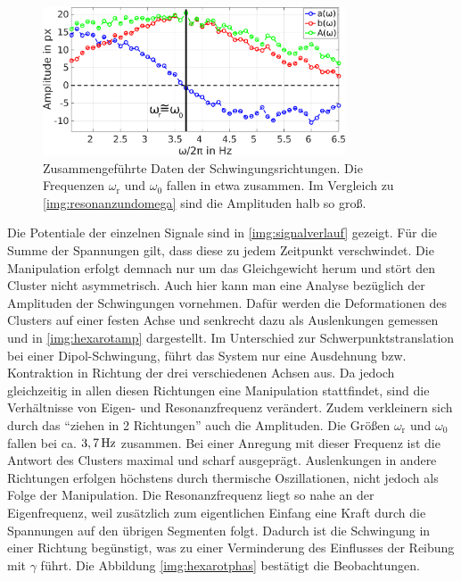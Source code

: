 \documentclass[numbers=noenddot,a4paper,notitlepage,twoside,BCOR15mm]{scrbook}
\newcommand{\ix}[1]{_\text{#1}}
\begin{document}
						\begin{figure}[!b]
							\centering
							\includegraphics[width=0.8\textwidth,height=0.37\textwidth]{figs/auswertung/phasen/rotphasenaufg.png}
							\caption{Zusammengeführte Daten der Schwingungsrichtungen. Die Frequenzen $\omega\ix{r}$ und $\omega\ix{0}$ fallen in etwa zusammen. Im Vergleich zu \autoref{img:resonanzundomega} sind die Amplituden halb so groß.}\label{img:hexarotphas}
						\end{figure}

						Die Potentiale der einzelnen Signale sind in \autoref{img:signalverlauf} gezeigt. Für die Summe der Spannungen gilt, dass diese zu jedem Zeitpunkt verschwindet. Die Manipulation erfolgt demnach nur um das Gleichgewicht herum und stört den Cluster nicht asymmetrisch. Auch hier kann man eine Analyse bezüglich der Amplituden der Schwingungen vornehmen. Dafür werden die Deformationen des Clusters auf einer festen Achse und senkrecht dazu als Auslenkungen gemessen und in \autoref{img:hexarotamp} dargestellt. Im Unterschied zur Schwerpunktstranslation bei einer Dipol-Schwingung, führt das System nur eine Ausdehnung bzw. Kontraktion in Richtung der drei verschiedenen Achsen aus. Da jedoch gleichzeitig in allen diesen Richtungen eine Manipulation stattfindet, sind die Verhältnisse von Eigen- und Resonanzfrequenz verändert. Zudem verkleinern sich durch das "`ziehen in 2 Richtungen"' auch die Amplituden. Die Größen $\omega\ix{r}$ und $\omega\ix{0}$ fallen bei ca. $\unit[3,7]{Hz}$ zusammen. Bei einer Anregung mit dieser Frequenz ist die Antwort des Clusters maximal und scharf ausgeprägt. Auslenkungen in andere Richtungen erfolgen höchstens durch thermische Oszillationen, nicht jedoch als Folge der Manipulation. Die Resonanzfrequenz liegt so nahe an der Eigenfrequenz, weil zusätzlich zum eigentlichen Einfang eine Kraft durch die Spannungen auf den übrigen Segmenten folgt. Dadurch ist die Schwingung in einer Richtung begünstigt, was zu einer Verminderung des Einflusses der Reibung mit $\gamma$ führt. Die Abbildung \autoref{img:hexarotphas} bestätigt die Beobachtungen.
\end{document}

